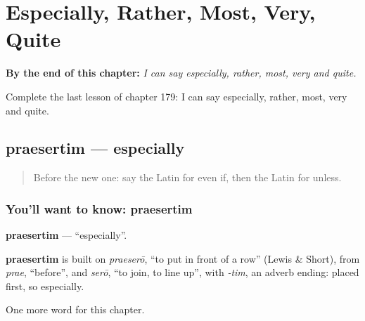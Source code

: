 
\chapter{Especially, Rather, Most, Very, Quite}
\label{ch:la-especially-rather-most-very-quite}

\begin{chapteropening}
\textbf{By the end of this chapter:} \emph{I can say especially, rather, most, very and quite.}

Complete the last lesson of chapter 179: I can say especially, rather, most, very and quite.
\end{chapteropening}

\section[praesertim]{praesertim — especially}

\label{lesson:LA-C179-praesertim}



\begin{quote}
Before the new one: say the Latin for even if, then the Latin for unless.
\end{quote}

\subsection*{You'll want to know: praesertim}
\textbf{praesertim} — \textquotedblleft{}especially\textquotedblright{}.

\begin{cousinweb}
\textbf{praesertim} is built on \emph{praeserō}, \textquotedblleft{}to put in front of a row\textquotedblright{} (Lewis \& Short), from \emph{prae}, \textquotedblleft{}before\textquotedblright{}, and \emph{serō}, \textquotedblleft{}to join, to line up\textquotedblright{}, with \emph{-tim}, an adverb ending: placed first, so especially.
\end{cousinweb}

\begin{grammarlens}[title={What you've built}]
One more word for this chapter.
\end{grammarlens}

